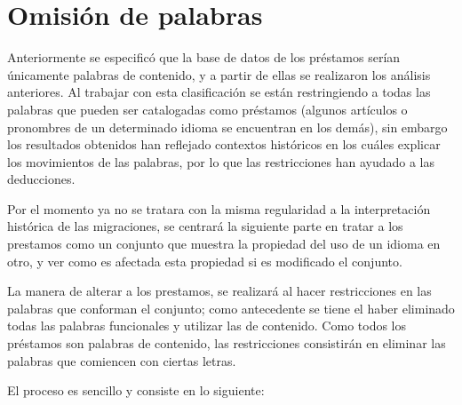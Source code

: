 \chapter{Omisión de palabras}

Anteriormente se especificó que la base de datos de los préstamos serían únicamente palabras de contenido, y a partir de ellas se realizaron los análisis anteriores.  Al trabajar con esta clasificación se están restringiendo a todas las palabras que pueden ser catalogadas como préstamos (algunos artículos o pronombres de un determinado idioma se encuentran en los demás), sin embargo los resultados obtenidos han reflejado contextos históricos en los cuáles explicar los movimientos de las palabras, por lo que las restricciones han ayudado a las deducciones. 

Por el momento ya no se tratara con la misma regularidad a la interpretación histórica de las migraciones, se centrará la siguiente parte en tratar a los prestamos como un conjunto que muestra la propiedad del uso de un idioma en otro, y ver como es afectada esta propiedad si es modificado el conjunto. 

La manera de alterar a los prestamos, se realizará al hacer restricciones en las palabras que conforman el conjunto; como antecedente se tiene el haber eliminado todas las palabras funcionales  y utilizar las de contenido.  Como todos los préstamos son palabras de contenido, las restricciones consistirán en eliminar las palabras que comiencen con ciertas letras.

\hfill\break

El proceso es sencillo y consiste en lo siguiente:
 


